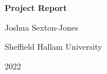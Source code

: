 \documentclass[a4paper]{report}
\begin{document}
\begin{titlepage}
  \centering
  \null %
  \vfill

  { \huge \bfseries Project Report }

  Joshua Sexton-Jones

  \vfill

  Sheffield Hallam University

  2022
\end{titlepage}





\tableofcontents \clearpage

\printglossary[title=Terminology]







\printbibliography
\end{document}
